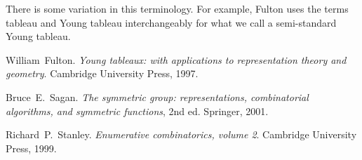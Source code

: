 \documentclass[12pt]{article}
\begin{document}
There is some variation in this terminology.  For example, Fulton uses the terms tableau and Young tableau interchangeably for what we call a semi-standard Young tableau.

\begin{thebibliography}{99}
William~Fulton. \emph{Young tableaux: with applications to representation theory and geometry}.  Cambridge University Press, 1997.

Bruce~E.~Sagan. \emph{The symmetric group: representations, combinatorial algorithms, and symmetric functions}, 2nd ed.  Springer, 2001.

Richard~P.~Stanley. \emph{Enumerative combinatorics, volume 2}.  Cambridge University Press, 1999.
\end{thebibliography}

\end{document}
